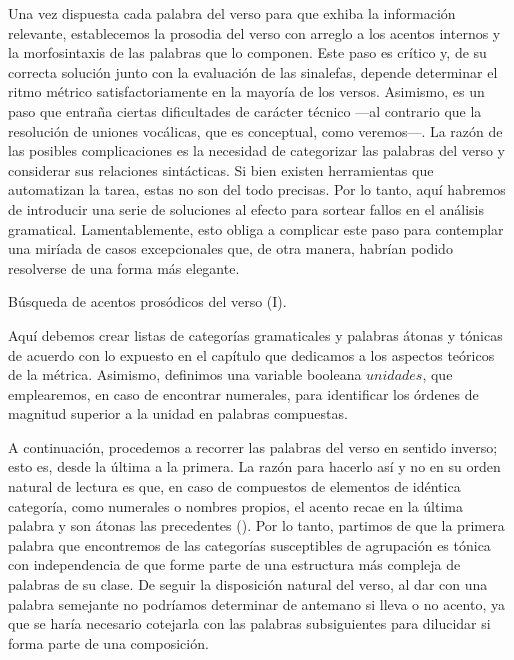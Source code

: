 Una vez dispuesta cada palabra del verso para que exhiba la información relevante, establecemos la prosodia del verso con arreglo a los acentos internos y la morfosintaxis de las palabras que lo componen. Este paso es crítico y, de su correcta solución junto con la evaluación de las sinalefas, depende determinar el ritmo métrico satisfactoriamente en la mayoría de los versos. Asimismo, es un paso que entraña ciertas dificultades de carácter técnico —al contrario que la resolución de uniones vocálicas, que es conceptual, como veremos—. La razón de las posibles complicaciones es la necesidad de categorizar las palabras del verso y considerar sus relaciones sintácticas. Si bien existen herramientas que automatizan la tarea, estas no son del todo precisas. Por lo tanto, aquí habremos de introducir una serie de soluciones al efecto para sortear fallos en el análisis gramatical. Lamentablemente, esto obliga a complicar este paso para contemplar una miríada de casos excepcionales que, de otra manera, habrían podido resolverse de una forma más elegante.

 \begin{algorithm}[!ht]
 	\caption{Búsqueda de acentos prosódicos del verso (I).}\label{list:findps1}
 \end{algorithm}

Aquí debemos crear listas de categorías gramaticales y palabras átonas y tónicas de acuerdo con lo expuesto en el capítulo que dedicamos a los aspectos teóricos de la métrica. Asimismo, definimos una variable booleana $unidades$, que emplearemos, en caso de encontrar numerales, para identificar los órdenes de magnitud superior a la unidad en palabras compuestas.

A continuación,  procedemos a recorrer las palabras del verso en sentido inverso; esto es, desde la última a la primera. La razón para hacerlo así y no en su orden natural de lectura es que, en caso de compuestos de elementos de idéntica categoría, como numerales o nombres propios,  el acento recae en la última palabra y son átonas las precedentes (). Por lo tanto, partimos de que la primera palabra que encontremos de las categorías susceptibles de agrupación es tónica con independencia de que forme parte de una estructura más compleja de palabras de su clase. De seguir la disposición natural del verso, al dar con una palabra semejante no podríamos determinar de antemano si lleva o no acento, ya que se haría necesario cotejarla con las palabras subsiguientes para dilucidar si forma parte de una composición.

